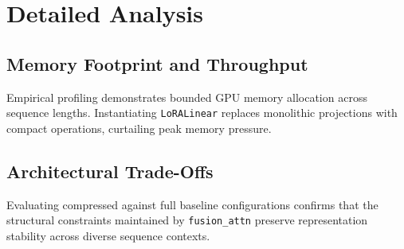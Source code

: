 \section{Detailed Analysis}

\subsection{Memory Footprint and Throughput}
Empirical profiling demonstrates bounded GPU memory allocation across sequence lengths. Instantiating \texttt{LoRALinear} replaces monolithic projections with compact operations, curtailing peak memory pressure.

\subsection{Architectural Trade-Offs}
Evaluating compressed against full baseline configurations confirms that the structural constraints maintained by \texttt{fusion_attn} preserve representation stability across diverse sequence contexts.
